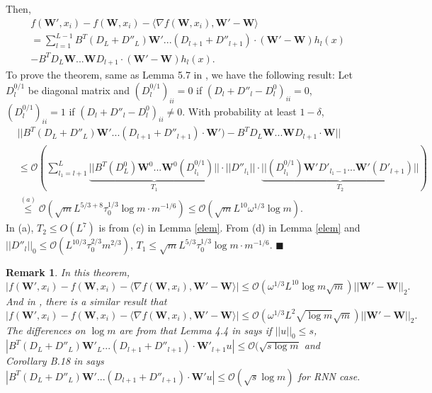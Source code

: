 \documentclass{article}
\newcommand{\cO}{\mathcal{O}}
\newtheorem{rem}{\textbf{Remark}}[section]
\newcommand*{\QEDA}{\hfill\ensuremath{\blacksquare}}%
\begin{document}
Then,
\begin{equation}
\begin{aligned}
&f(\bm{W}',x_i)-f(\bm{W},x_i)-\langle \nabla f(\bm{W},x_i), \bm{W}'-\bm{W}\rangle\\
&=\sum_{l=1}^{L-1}B^T(D_L+D''_L)\bm{W}'...(D_{l+1}+D''_{l+1})\cdot (\bm{W}'-\bm{W})h_l(x)\\
&-B^TD_L\bm{W}...\bm{W}D_{l+1}\cdot (\bm{W}'-\bm{W})h_l(x).
\end{aligned}
\end{equation}
To prove the theorem, same as Lemma 5.7 in \cite{allenzhu2019convergence}, we have the following result:
Let $D^{0/1}_l$  be diagonal matrix and $(D^{0/1}_l)_{ii}=0$ if $(D_l+D''_l-D^0_l)_{ii}=0$,  $(D^{0/1}_l)_{ii}=1$ if $(D_l+D''_l-D^0_l)_{ii}\neq 0$. With probability at least $1-\delta$,
\begin{equation}
\begin{aligned}
&||B^T(D_L+D''_L)\bm{W}'...(D_{l+1}+D''_{l+1})\cdot \bm{W}')-B^TD_L\bm{W}...\bm{W}D_{l+1}\cdot \bm{W}||\\
&\leq \cO(\sum_{l_1=l+1}^L\underbrace{||B^T(D^0_L)\bm{W}^0...\bm{W}^0(D^{0/1}_{l_1})||}_{T_1}\cdot ||D''_{l_1}||\cdot \underbrace{||(D^{0/1}_{l_1})\bm{W}'D'_{l_1-1}...\bm{W}'(D'_{l+1})||}_{T_2})\\
&\overset{(a)}{\leq} \cO(\sqrt{m}L^{5/3+8}\tau_0^{1/3}\log m\cdot m^{-1/6})\leq \cO(\sqrt{m}L^{10}\omega^{1/3}\log m).
\end{aligned}
\end{equation}
In (a), $T_2\leq O(L^7)$ is from (c) in Lemma \ref{elem}.  From (d) in Lemma \ref{elem} and $||D''_l||_0\leq   \cO(L^{10/3}\tau_0^{2/3}m^{2/3})$, $T_1\leq \sqrt{m}L^{5/3}\tau_0^{1/3}\log m\cdot m^{-1/6}$.
\QEDA

\begin{rem}
In this theorem,
\begin{equation}
|f(\bm{W}',x_i)-f(\bm{W},x_i)-\langle \nabla f(\bm{W},x_i), \bm{W}'-\bm{W}\rangle |\leq \cO(\omega^{1/3}L^{10}\log m \sqrt{m})||\bm{W}'-\bm{W}||_2.
\end{equation}
And in \cite{cao}, there is a similar result that
\begin{equation}
|f(\bm{W}',x_i)-f(\bm{W},x_i)-\langle \nabla f(\bm{W},x_i), \bm{W}'-\bm{W}\rangle |\leq \cO(\omega^{1/3}L^2\sqrt{\log m} \sqrt{m})||\bm{W}'-\bm{W}||_2.
\end{equation}
The differences on $\log m$ are from that Lemma 4.4 in \cite{allenzhu2019convergence} says if $||u||_0\leq s$, $|B^T(D_L+D''_L)\bm{W}'_L...(D_{l+1}+D''_{l+1})\cdot \bm{W}'_{l+1}u|\leq\cO(\sqrt{s \log m}$
and Corollary B.18 in \cite{rate} says $|B^T(D_L+D''_L)\bm{W}'...(D_{l+1}+D''_{l+1})\cdot \bm{W}'u|\leq\cO(\sqrt{s}\log m)$ for RNN case.
\end{rem}
\end{document}
